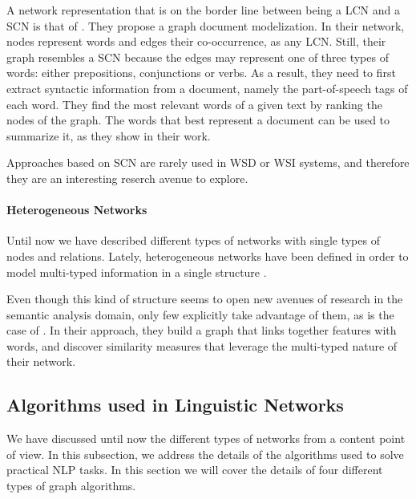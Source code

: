 A network representation that is on the border line between being a LCN and a SCN is that of \cite{2013.Bronselaer.TextAnalysisWithGraphs}. They  propose a graph document modelization. In their network, nodes represent words and edges their co-occurrence, as any LCN. Still, their graph resembles a SCN because the edges may represent one of three types of words: either prepositions, conjunctions or verbs. As a result,  they need to first extract syntactic information from a document, namely the part-of-speech tags of each word. They find the most relevant words of a given text by ranking the nodes of the graph. The words that best represent a document can be used to summarize it, as they show in their work.

Approaches based on SCN are rarely used in WSD or WSI systems, and therefore they are an interesting reserch avenue to explore.


\paragraph{Heterogeneous Networks}
Until now we have described different types of networks with single types of nodes and relations. Lately, heterogeneous networks have been defined in order to model multi-typed information in a single structure \cite{Jiawei2009}. 

Even though this kind of structure seems to open new avenues of research in the semantic analysis domain, only few explicitly take advantage of them, as is the case of \cite{2013.Saluja.Graph-BasedUnsupervisedLearning}. In their approach, they build a graph that links together features with words, and discover similarity measures that leverage the multi-typed nature of their network.

 
 
\subsection{Algorithms used in Linguistic Networks}

We have discussed until now the different types of networks from a content point of view. In this subsection, we address the details of the algorithms used to solve practical NLP tasks. In this section we will cover the details of four different types of graph algorithms.



